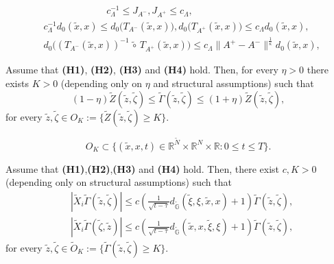 \documentclass[10pt,a4paper]{amsart}
\def \G {{\Gamma}}
\def \GG {{\mathbb{G}}}
\newcommand{\R}{\mathbb{R}}
\def \rn {{\mathbb {R}}^{N}}
\def \rnm {{\mathbb {R}}^{\tilde N}}
\def \t {{\tau}}
\def \ti {\times}
\def \tt {\tilde}
\def \x {{\xi}}
\def \y {{\eta}}
\def \z {{\zeta}}
\begin{document}
	\begin{equation}\label{two-ineq}
		\begin{aligned}
			&\qquad \qquad \qquad\;\; c_\Lambda^{-1} \leq J_{A^-}, J_{A^+} \leq c_\Lambda, \\
			&c_\Lambda^{-1}  d_0(\tt x,x) \leq d_0\big(T_{A^-}(\tt x,x)\big),d_0\big(T_{A^+}(\tt x,x)\big) \leq c_\Lambda d_0(\tt x,x), \\
			& d_0\big((T_{A^-}(\tt x,x))^{-1} \,\tt\circ\, T_{A^+}(\tt x,x)\big) \leq c_\Lambda \|A^+ - A^-\|^{\frac{1}{\kappa}} d_0(\tt x,x),
		\end{aligned}
	\end{equation}

\begin{proposition}\label{Prop-closetoparametrix}
	Assume that \textbf{(H1)}, \textbf{(H2)}, \textbf{(H3)} and \textbf{(H4)} hold. Then, for every $\y>0$ there exists $K>0$ (depending only on $\y$ and structural assumptions) such that 
	\begin{equation}\label{close-to-parametrix}
		(1-\y)\tt Z(\tt z,\tt \z)\leq \tt\G(\tt z,\tt \z)\leq (1+\y)\tt Z(\tt z,\tt \z),
	\end{equation}
	for every $\tt z,\tt \z\in O_K:=\Big\{\tt Z(\tt z,\tt \z)\geq K\Big\}$.
\end{proposition}

	\begin{equation}\label{time-estimate}
		O_K\subset \Big\{(\tt x,x, t)\in \rnm\ti \rn\ti\R : 0\leq t\leq T\Big\}.
	\end{equation}

\begin{proposition}\label{Bound-derivative}	
	Assume that \textbf{(H1)},\textbf{(H2)},\textbf{(H3)} and \textbf{(H4)} hold. Then, there exist $c,K>0$ (depending only on structural assumptions) such that 
	\begin{equation}\label{bound-derivative}
		\begin{aligned}
			&|\tt X_i \tt \G(\tt z,\tt \z)|\leq c \left(\frac{1}{\sqrt{t-\t}}d_{\tt\GG}(\tt \x,\x,\tt x,x) + 1 \right) \tt \G(\tt z,\tt \z),\\
			&|\tt X_i \tt \G(\tt \z,\tt z)|\leq c \left(\frac{1}{\sqrt{t-\t}}d_{\tt\GG}(\tt x,x,\tt \x, \x) + 1 \right) \tt \G(\tt z,\tt \z),
		\end{aligned}
	\end{equation}
	for every $\tt z,\tt \z \in \tt O_K:=\big\{\tt\G(\tt z,\tt \z)\geq K\big\}$. 
\end{proposition}
\end{document}
